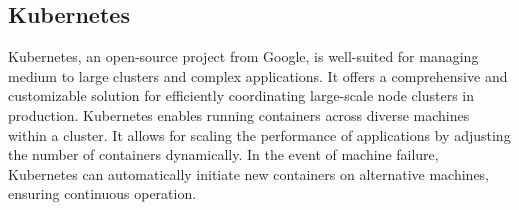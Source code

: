 \subsection{Kubernetes}
Kubernetes, an open-source project from Google, is well-suited for managing medium to large clusters and complex applications. 
It offers a comprehensive and customizable solution for efficiently coordinating large-scale node clusters in production. 
Kubernetes enables running containers across diverse machines within a cluster. 
It allows for scaling the performance of applications by adjusting the number of containers dynamically. 
In the event of machine failure, Kubernetes can automatically initiate new containers on alternative machines, ensuring continuous operation.